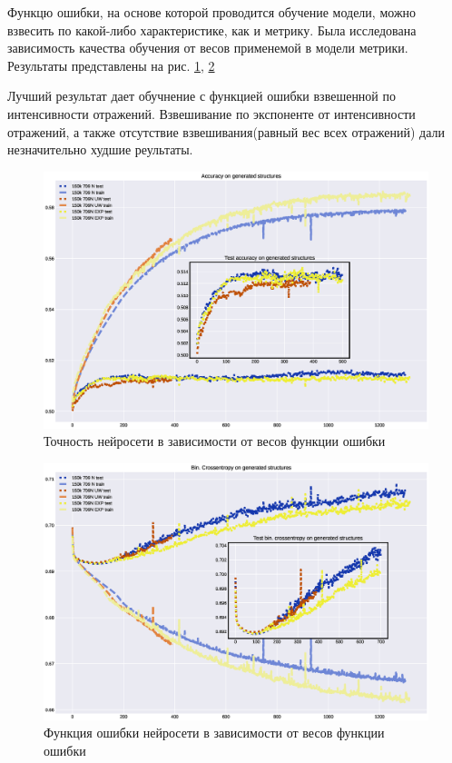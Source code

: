 \documentclass{article}
\begin{document}
Функцю ошибки, на основе которой проводится обучение модели, можно взвесить по какой-либо характеристике, как и метрику. Была исследована зависимость качества обучения от весов применемой в модели метрики. Результаты представлены на рис. \ref{fig:acc_weight}, \ref{fig:loss_weight}

Лучший результат дает обучнение с функцией ошибки взвешенной по интенсивности отражений. Взвешивание по экспоненте от интенсивности отражений, а также отсутствие взвешивания(равный вес всех отражений) дали незначительно худшие реультаты. 

\begin{figure}[!htp]
\includegraphics[width=\linewidth]{imgs/acc-weight.eps}
  \caption{Точность нейросети в зависимости от весов функции ошибки}\label{fig:acc_weight}
\end{figure}

\begin{figure}[!htp]
\includegraphics[width=\linewidth]{imgs/loss-weight.eps}
  \caption{Функция ошибки нейросети в зависимости от весов функции ошибки}\label{fig:loss_weight}
\end{figure}
\end{document}
